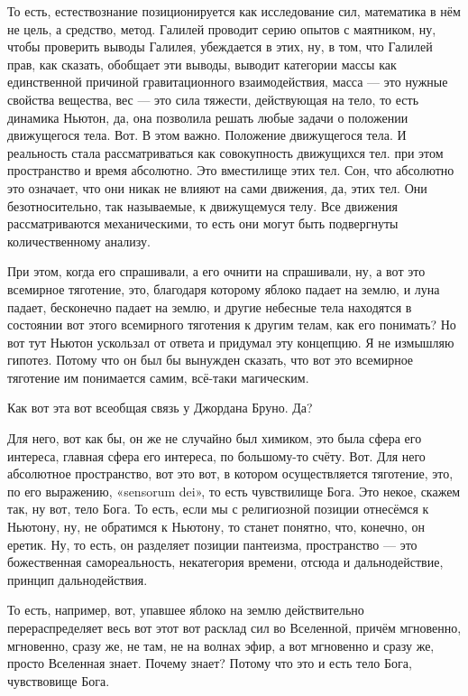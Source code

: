 То есть, естествознание
позиционируется как исследование сил, математика в нём не цель, а средство,
метод. Галилей проводит серию опытов с маятником, ну, чтобы проверить выводы
Галилея, убеждается в этих, ну, в том, что Галилей прав, как сказать, обобщает
эти выводы, выводит категории массы как единственной причиной гравитационного
взаимодействия, масса — это нужные свойства вещества, вес — это сила тяжести,
действующая на тело, то есть динамика Ньютон, да, она позволила решать любые
задачи о положении движущегося тела. Вот. В этом важно. Положение движущегося
тела. И реальность стала рассматриваться как совокупность движущихся тел. при
этом пространство и время абсолютно. Это вместилище этих тел. Сон, что абсолютно
это означает, что они никак не влияют на сами движения, да, этих тел. Они
безотносительно, так называемые, к движущемуся телу. Все движения
рассматриваются механическими, то есть они могут быть подвергнуты
количественному анализу. 

При этом, когда его спрашивали, а его очнити на
спрашивали, ну, а вот это всемирное тяготение, это, благодаря которому яблоко
падает на землю, и луна падает, бесконечно падает на землю, и другие небесные
тела находятся в состоянии вот этого всемирного тяготения к другим телам, как
его понимать? Но вот тут Ньютон ускользал от ответа и придумал эту концепцию. Я
не измышляю гипотез. Потому что он был бы вынужден сказать, что вот это
всемирное тяготение им понимается самим, всё-таки магическим. 

Как вот эта вот всеобщая связь у Джордана Бруно. Да? 

Для него, вот как бы, он же не случайно был
химиком, это была сфера его интереса, главная сфера его интереса, по большому-то
счёту. Вот. Для него абсолютное пространство, вот это вот, в котором
осуществляется тяготение, это, по его выражению, «sensorum dei», то есть
чувствилище Бога. Это некое, скажем так, ну вот, тело Бога. То есть, если мы с
религиозной позиции отнесёмся к Ньютону, ну, не обратимся к Ньютону, то станет
понятно, что, конечно, он еретик. Ну, то есть, он разделяет позиции пантеизма,
пространство — это божественная самореальность, некатегория времени, отсюда и
дальнодействие, принцип дальнодействия. 

То есть, например, вот, упавшее яблоко
на землю действительно перераспределяет весь вот этот вот расклад сил во
Вселенной, причём мгновенно, мгновенно, сразу же, не там, не на волнах эфир, а
вот мгновенно и сразу же, просто Вселенная знает. Почему знает? Потому что это и
есть тело Бога, чувствовище Бога. 

